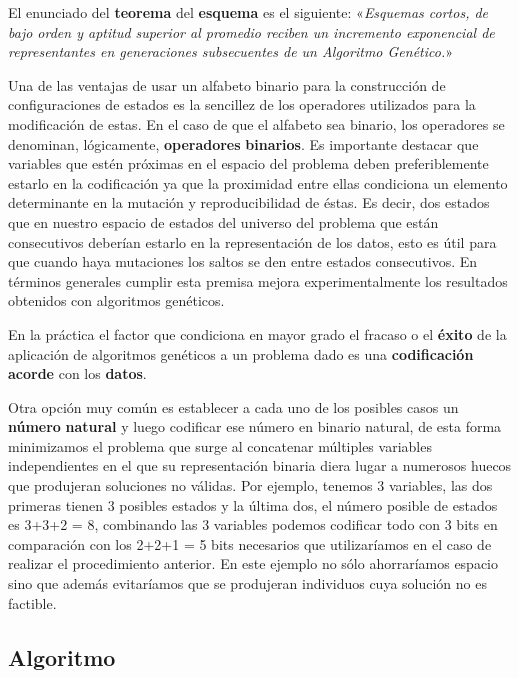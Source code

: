 \documentclass[
  a4paper,
  DIV=11,
  numbers=noendperiod]{scrreprt}
\begin{document}
El enunciado del \textbf{teorema} del \textbf{esquema} es el siguiente:
«\emph{Esquemas cortos, de bajo orden y aptitud superior al promedio
reciben un incremento exponencial de representantes en generaciones
subsecuentes de un Algoritmo Genético.}»

Una de las ventajas de usar un alfabeto binario para la construcción de
configuraciones de estados es la sencillez de los operadores utilizados
para la modificación de estas. En el caso de que el alfabeto sea
binario, los operadores se denominan, lógicamente, \textbf{operadores}
\textbf{binarios}. Es importante destacar que variables que estén
próximas en el espacio del problema deben preferiblemente estarlo en la
codificación ya que la proximidad entre ellas condiciona un elemento
determinante en la mutación y reproducibilidad de éstas. Es decir, dos
estados que en nuestro espacio de estados del universo del problema que
están consecutivos deberían estarlo en la representación de los datos,
esto es útil para que cuando haya mutaciones los saltos se den entre
estados consecutivos. En términos generales cumplir esta premisa mejora
experimentalmente los resultados obtenidos con algoritmos genéticos.

En la práctica el factor que condiciona en mayor grado el fracaso o el
\textbf{éxito} de la aplicación de algoritmos genéticos a un problema
dado es una \textbf{codificación} \textbf{acorde} con los
\textbf{datos}.

Otra opción muy común es establecer a cada uno de los posibles casos un
\textbf{número} \textbf{natural} y luego codificar ese número en binario
natural, de esta forma minimizamos el problema que surge al concatenar
múltiples variables independientes en el que su representación binaria
diera lugar a numerosos huecos que produjeran soluciones no válidas. Por
ejemplo, tenemos 3 variables, las dos primeras tienen 3 posibles estados
y la última dos, el número posible de estados es 3+3+2 = 8, combinando
las 3 variables podemos codificar todo con 3 bits en comparación con los
2+2+1 = 5 bits necesarios que utilizaríamos en el caso de realizar el
procedimiento anterior. En este ejemplo no sólo ahorraríamos espacio
sino que además evitaríamos que se produjeran individuos cuya solución
no es factible.

\hypertarget{algoritmo}{%
\subsection{Algoritmo}\label{algoritmo}}
\end{document}
